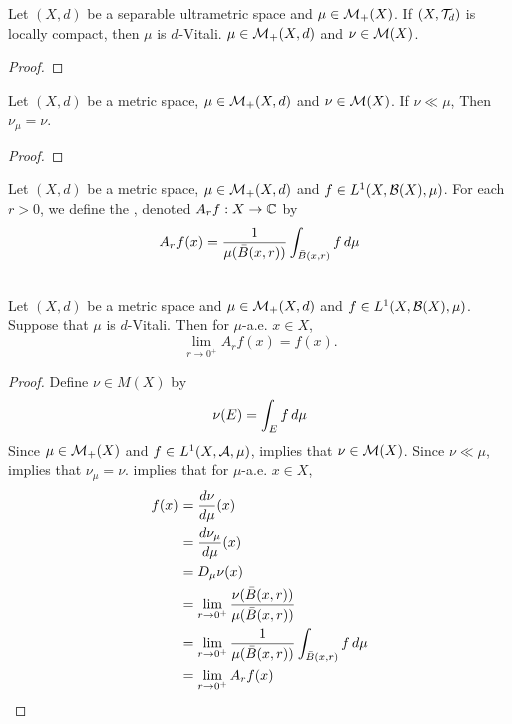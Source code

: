 \documentclass{book}
\begin{document}
	\begin{ex}
		Let $(X, d)$ be a separable ultrametric space and $\mu \in \mathcal{M}_+(X)$. If $(X, \mathcal{T}_d)$ is locally compact, then $\mu$ is $d$-Vitali. $\mu \in \mathcal{M}_+(X, d)$ and $\nu \in \mathcal{M}(X)$.
	\end{ex}
	
	\begin{proof}
	\end{proof}

	\begin{ex} 
		Let $(X, d)$ be a metric space, $\mu \in \mathcal{M}_+(X, d)$ and $\nu \in \mathcal{M}(X)$. If $\nu \ll \mu$, Then $\nu_{\mu} = \nu$.
	\end{ex}

	\begin{proof}
	\end{proof}
	
	\begin{defn} 
		Let $(X, d)$ be a metric space, $\mu \in \mathcal{M}_+(X, d)$ and $f \in L^1(X, \mathcal{B}(X), \mu)$. For each $r > 0$, we define the , denoted $A_rf: X \rightarrow \mathbb{C}$ by 
		$$A_rf(x) = \frac{1}{\mu(\bar{B}(x, r))} \int_{\bar{B}(x, r)} f \, d \mu$$
	\end{defn}

	\begin{ex}   \\
		Let $(X, d)$ be a metric space and $\mu \in \mathcal{M}_+(X, d)$ and $f \in L^1(X, \mathcal{B}(X), \mu)$. Suppose that $\mu$ is $d$-Vitali. Then for $\mu$-a.e. $x \in X$,
		$$\lim_{r \rightarrow 0^+} A_r f(x) = f(x).$$
	\end{ex}

	\begin{proof} 
		Define $\nu \in M(X)$ by 
		$$\nu(E) = \int_E f \, d \mu $$ 
		Since $\mu \in \mathcal{M}_+(X)$ and $f \in L^1(X, \mathcal{A}, \mu)$,  implies that $\nu \in \mathcal{M}(X)$. Since $\nu \ll \mu$,  implies that $\nu_{\mu} = \nu$.  implies that for $\mu$-a.e. $x \in X$,
		\begin{align*}
			f(x)
			& = \frac{d \nu}{d \mu}(x) \\
			& = \frac{d \nu_{\mu}}{d \mu}(x) \\
			& = D_{\mu} \nu(x) \\
			& = \lim_{r \rightarrow 0^+} \frac{\nu(\bar{B}(x,r))}{\mu(\bar{B}(x,r))} \\
			& = \lim_{r \rightarrow 0^+} \frac{1}{\mu(\bar{B}(x,r))} \int_{\bar{B}(x,r)} f \, d \mu  \\
			& = \lim_{r \rightarrow 0^+} A_r f(x)
		\end{align*} 
	\end{proof}
	
\end{document}
